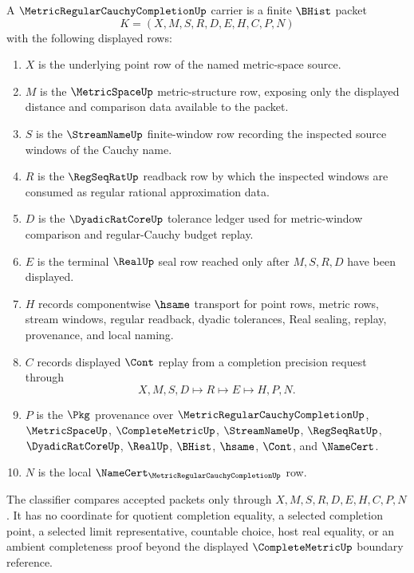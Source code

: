 \begin{definition}
\label{def:metric-regular-cauchy-completion-carrier}
A $\MetricRegularCauchyCompletionUp$ carrier is a finite $\BHist$ packet
$$
K=(X,M,S,R,D,E,H,C,P,N)
$$
with the following displayed rows:
\begin{enumerate}
\item $X$ is the underlying point row of the named metric-space source.
\item $M$ is the $\MetricSpaceUp$ metric-structure row, exposing only the displayed distance and comparison data available to the packet.
\item $S$ is the $\StreamNameUp$ finite-window row recording the inspected source windows of the Cauchy name.
\item $R$ is the $\RegSeqRatUp$ readback row by which the inspected windows are consumed as regular rational approximation data.
\item $D$ is the $\DyadicRatCoreUp$ tolerance ledger used for metric-window comparison and regular-Cauchy budget replay.
\item $E$ is the terminal $\RealUp$ seal row reached only after $M,S,R,D$ have been displayed.
\item $H$ records componentwise $\hsame$ transport for point rows, metric rows, stream windows, regular readback, dyadic tolerances, Real sealing, replay, provenance, and local naming.
\item $C$ records displayed $\Cont$ replay from a completion precision request through
$$
X,M,S,D \longmapsto R \longmapsto E \longmapsto H,P,N .
$$
\item $P$ is the $\Pkg$ provenance over $\MetricRegularCauchyCompletionUp$, $\MetricSpaceUp$, $\CompleteMetricUp$, $\StreamNameUp$, $\RegSeqRatUp$, $\DyadicRatCoreUp$, $\RealUp$, $\BHist$, $\hsame$, $\Cont$, and $\NameCert$.
\item $N$ is the local $\NameCert_{\MetricRegularCauchyCompletionUp}$ row.
\end{enumerate}
The classifier compares accepted packets only through $X,M,S,R,D,E,H,C,P,N$. It has no coordinate for quotient completion equality, a selected completion point, a selected limit representative, countable choice, host real equality, or an ambient completeness proof beyond the displayed $\CompleteMetricUp$ boundary reference.
\end{definition}

